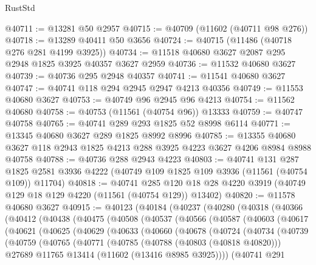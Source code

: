 \begin{lexlean}{RustStd}
\begin{coremodule}
@40711 := @13281 @50 @2957
@40715 := @40709 (@11602 (@40711 @98 @276))
@40718 := @13289 @40411 @50 @3656
@40724 := @40715 (@11486 (@40718 @276 @281 @4199 @3925))
@40734 := @11518 @40680 @3627 @2087 @295 @2948 @1825 @3925 @40357 @3627 @2959
@40736 := @11532 @40680 @3627
@40739 := @40736 @295 @2948 @40357
@40741 := @11541 @40680 @3627
@40747 := @40741 @118 @294 @2945 @2947 @4213 @40356
@40749 := @11553 @40680 @3627
@40753 := @40749 @96 @2945 @96 @4213
@40754 := @11562 @40680
@40758 := @40753 (@11561 (@40754 @96)) @13333
@40759 := @40747 @40758
@40765 := @40741 @289 @293 @1825 @52 @8998 @6114
@40771 := @13345 @40680 @3627 @289 @1825 @8992 @8996
@40785 := @13355 @40680 @3627 @118 @2943 @1825 @4213 @288 @3925 @4223 @3627 @4206 @8984 @8988 @40758
@40788 := @40736 @288 @2943 @4223
@40803 := @40741
    @131
    @287
    @1825
    @2581
    @3936
    @4222
    (@40749 @109 @1825 @109 @3936 (@11561 (@40754 @109)) @11704)
@40818 := @40741
    @285
    @120
    @18
    @28
    @4220
    @3919
    (@40749 @129 @18 @129 @4220 (@11561 (@40754 @129)) @13402)
@40820 := @11578 @40680 @3627
@40915 := @40123
    (@40184
      (@40237
        (@40280
          (@40318
            (@40366
              (@40412
                (@40438
                  (@40475
                    (@40508
                      (@40537
                        (@40566
                          (@40587
                            (@40603
                              (@40617
                                (@40621
                                  (@40625
                                    (@40629
                                      (@40633
                                        (@40660
                                          (@40678
                                            (@40724
                                              (@40734
                                                (@40739
                                                  (@40759
                                                    (@40765
                                                      (@40771
                                                        (@40785
                                                          (@40788 (@40803 (@40818 @40820)))
                                                          @27689
                                                          @11765
                                                          @13414
                                                          (@11602 (@13416 @8985 @3925))))
                                                      (@40741
                                                        @291

\end{coremodule}
\end{lexlean}
